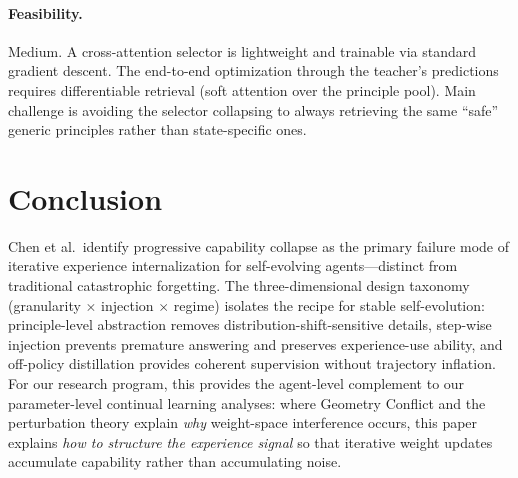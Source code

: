 \documentclass[11pt,a4paper]{article}
\begin{document}
\paragraph{Feasibility.} Medium. A cross-attention selector is lightweight and trainable via standard gradient descent. The end-to-end optimization through the teacher's predictions requires differentiable retrieval (soft attention over the principle pool). Main challenge is avoiding the selector collapsing to always retrieving the same ``safe'' generic principles rather than state-specific ones.

\section{Conclusion}

Chen et al.\ identify progressive capability collapse as the primary failure mode of iterative experience internalization for self-evolving agents---distinct from traditional catastrophic forgetting. The three-dimensional design taxonomy (granularity $\times$ injection $\times$ regime) isolates the recipe for stable self-evolution: principle-level abstraction removes distribution-shift-sensitive details, step-wise injection prevents premature answering and preserves experience-use ability, and off-policy distillation provides coherent supervision without trajectory inflation. For our research program, this provides the agent-level complement to our parameter-level continual learning analyses: where Geometry Conflict and the perturbation theory explain \emph{why} weight-space interference occurs, this paper explains \emph{how to structure the experience signal} so that iterative weight updates accumulate capability rather than accumulating noise.
\end{document}
